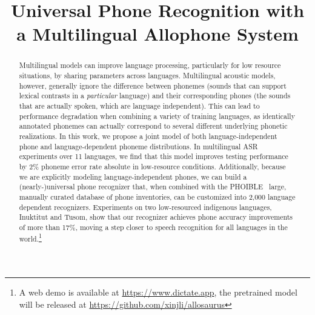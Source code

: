 \documentclass{article}
\title{Universal Phone Recognition with a Multilingual Allophone System}
\newcommand{\gn}[1]{\textcolor{magenta}{\small [#1 --GN]}}
\newcommand{\drm}[1]{\textcolor{orange}{\small [#1 ---DRM]}}
\newcommand{\jl}[1]{\textcolor{gray}{\small [#1 ---JL]}}
\begin{document}
\ninept

\maketitle

\begin{abstract}                                                          
Multilingual models can improve language processing, particularly for low resource situations, by sharing parameters across languages.
Multilingual acoustic models, however, generally ignore the difference between phonemes (sounds that can support lexical contrasts in a \emph{particular} language)
and their corresponding phones (the sounds that are actually spoken, which are language independent).
This can lead to performance degradation when combining a variety of training languages, as identically annotated phonemes can actually correspond to several different underlying phonetic realizations.
In this work, we propose a joint model of both language-independent phone and language-dependent phoneme distributions.
In multilingual ASR experiments over 11 languages, we find that this model improves testing performance by 2\% phoneme error rate absolute in low-resource conditions.
Additionally, because we are explicitly modeling language-independent phones, we can build a (nearly-)universal phone recognizer
that, when combined with the PHOIBLE~\cite{phoible} large, manually curated database of phone inventories, can be customized into 2,000 language dependent recognizers.
Experiments on two low-resourced indigenous languages, Inuktitut and Tusom, show that our recognizer achieves phone accuracy improvements of more than 17\%, moving a step closer to speech recognition for all languages in the world.\footnote{A web demo is available at \url{https://www.dictate.app}, the pretrained model will be released at \url{https://github.com/xinjli/allosaurus}}


\end{abstract}
\end{document}
